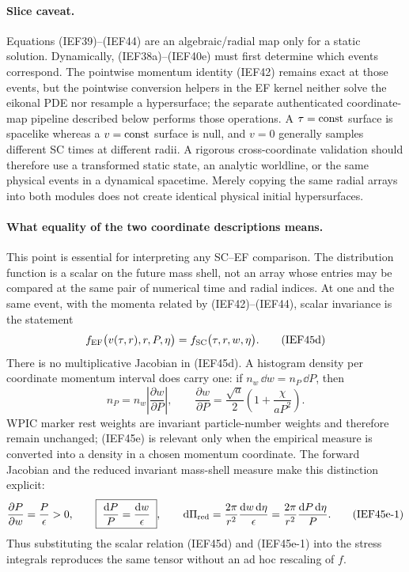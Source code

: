 \paragraph{Slice caveat.}
Equations (IEF39)--(IEF44) are an algebraic/radial map only for a static
solution.  Dynamically, (IEF38a)--(IEF40e) must first determine which events
correspond.  The pointwise momentum identity (IEF42) remains exact at those
events, but the pointwise conversion helpers in the EF kernel neither solve
the eikonal PDE nor resample a hypersurface; the separate authenticated
coordinate-map pipeline described below performs those operations.  A
\(\tau={\rm const}\) surface is spacelike whereas a
\(v={\rm const}\) surface is null, and \(v=0\) generally samples different SC
times at different radii.  A rigorous cross-coordinate validation should
therefore use a transformed static state, an analytic worldline, or
the same physical events in a dynamical spacetime.  Merely copying the same radial arrays
into both modules does not create identical physical initial hypersurfaces.

\paragraph{What equality of the two coordinate descriptions means.}
This point is essential for interpreting any SC--EF comparison.  The
distribution function is a scalar on the future mass shell, not an array
whose entries may be compared at the same pair of numerical time and radial
indices.  At one and the same event, with the momenta related by
(IEF42)--(IEF44), scalar invariance is the statement
\[
 f_{\rm EF}\bigl(v(\tau,r),r,P,\eta\bigr)
 =f_{\rm SC}\bigl(\tau,r,w,\eta\bigr).             \tag{IEF45d}
\]
There is no multiplicative Jacobian in (IEF45d).  A histogram density per
coordinate momentum interval does carry one: if
\(n_w\,\dd w=n_P\,\dd P\), then
\[
 n_P=n_w\left|\frac{\partial w}{\partial P}\right|,
 \qquad
 \frac{\partial w}{\partial P}
 =\frac{\sqrt a}{2}\left(1+\frac{\chi}{aP^2}\right). \tag{IEF45e}
\]
WPIC marker rest weights are invariant particle-number weights and therefore
remain unchanged; (IEF45e) is relevant only when the empirical measure is
converted into a density in a chosen momentum coordinate.
The forward Jacobian and the reduced invariant mass-shell measure make this
distinction explicit:
\[
 \frac{\partial P}{\partial w}=\frac P\epsilon>0,
 \qquad
 \boxed{\;\frac{\mathrm d P}{P}=\frac{\mathrm d w}{\epsilon}\;},
 \qquad
 \mathrm d\Pi_{\rm red}
 =\frac{2\pi}{r^2}\frac{\mathrm d w\,\mathrm d\eta}{\epsilon}
 =\frac{2\pi}{r^2}\frac{\mathrm d P\,\mathrm d\eta}{P}.      \tag{IEF45e-1}
\]
Thus substituting the scalar relation (IEF45d) and (IEF45e-1) into the
stress integrals reproduces the same tensor without an ad hoc rescaling of
\(f\).

